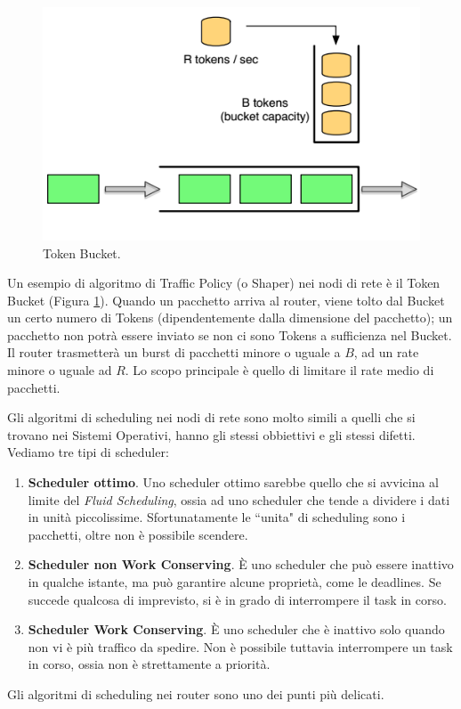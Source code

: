 \begin{figure}[htbp]
	\centering
	\includegraphics[scale = 0.5]{images/token-bucket}
	\caption{Token Bucket.}
	\label{img:token-bucket}
\end{figure}
Un esempio di algoritmo di Traffic Policy (o Shaper) nei nodi di rete è il Token Bucket (Figura \ref{img:token-bucket}). Quando un pacchetto arriva al router, viene tolto dal Bucket un certo numero di Tokens (dipendentemente dalla dimensione del pacchetto); un pacchetto non potrà essere inviato se non ci sono Tokens a sufficienza nel Bucket. Il router trasmetterà un burst di pacchetti minore o uguale a $B$, ad un rate minore o uguale ad $R$. Lo scopo principale è quello di limitare il rate medio di pacchetti.

Gli algoritmi di scheduling nei nodi di rete sono molto simili a quelli che si trovano nei Sistemi Operativi, hanno gli stessi obbiettivi e gli stessi difetti. Vediamo tre tipi di scheduler:
\begin{enumerate}
	\item \textbf{Scheduler ottimo}. Uno scheduler ottimo sarebbe quello che si avvicina al limite del \textit{Fluid Scheduling}, ossia ad uno scheduler che tende a dividere i dati in unità piccolissime. Sfortunatamente le \textquotedblleft unita" di scheduling sono i pacchetti, oltre non è possibile scendere.
	\item \textbf{Scheduler non Work Conserving}. È uno scheduler che può essere inattivo in qualche istante, ma può garantire alcune proprietà, come le deadlines. Se succede qualcosa di imprevisto, si è in grado di interrompere il task in corso.
	\item \textbf{Scheduler Work Conserving}. È uno scheduler che è inattivo solo quando non vi è più traffico da spedire. Non è possibile tuttavia interrompere un task in corso, ossia non è strettamente a priorità.
\end{enumerate}
Gli algoritmi di scheduling nei router sono uno dei punti più delicati.

